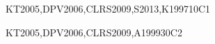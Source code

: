 \begin{syllabus}
\begin{unit}{\ALBasicAnalysis}{}{KT2005,DPV2006,CLRS2009,S2013,K1997}{10}{C1}
\begin{learningoutcomes}
    \item \ALBasicAnalysisLOExplainThe [\Assessment] %
    \item \ALBasicAnalysisLOUseRecurrence [\Assessment] %
    \item \ALBasicAnalysisLOSolve [\Assessment] %
\end{learningoutcomes}
\end{unit}

\begin{unit}{\ALAlgorithmicStrategies}{}{KT2005,DPV2006,CLRS2009,A1999}{30}{C2}
\begin{topics}%
    \item \ALAlgorithmicStrategiesTopicBrute %
    \item \ALAlgorithmicStrategiesTopicGreedy %
    \item \ALAlgorithmicStrategiesTopicDivide %
    \item \ALAlgorithmicStrategiesTopicDynamic %
\end{topics}
\begin{learningoutcomes}
    \item \ALAlgorithmicStrategiesLOFor [\Assessment] %
    \item \ALAlgorithmicStrategiesLOUseA [\Assessment] %
    \item \ALAlgorithmicStrategiesLOUseAConquer [\Assessment] %
    \item \ALAlgorithmicStrategiesLOUseDynamic [\Assessment] %
    \item \ALAlgorithmicStrategiesLODetermineAn [\Assessment] %
\end{learningoutcomes}
\end{unit}


\end{syllabus}
